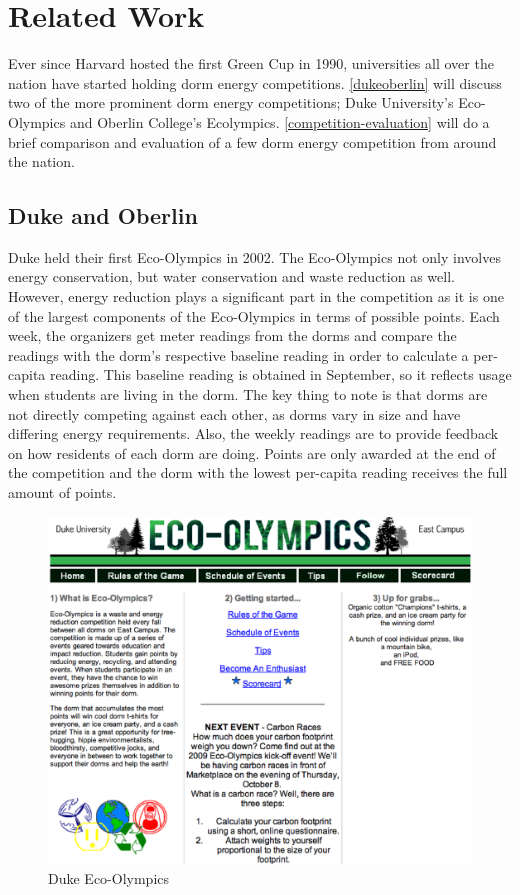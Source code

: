 \chapter{Related Work}
\label{relatedwork}

Ever since Harvard hosted the first Green Cup in 1990\cite{harvard-greencup}, universities all over the nation have started holding dorm energy competitions. \autoref{dukeoberlin} will discuss two of the more prominent dorm energy competitions; Duke University's Eco-Olympics and Oberlin College's Ecolympics.  \autoref{competition-evaluation} will do a brief comparison and evaluation of a few dorm energy competition from around the nation.

\section{Duke and Oberlin}
\label{dukeoberlin}

Duke held their first Eco-Olympics\cite{duke-eco-olympics} in 2002.  The Eco-Olympics not only involves energy conservation, but water conservation and waste reduction as well.  However, energy reduction plays a significant part in the competition as it is one of the largest components of the Eco-Olympics in terms of possible points.  Each week, the organizers get meter readings from the dorms and compare the readings with the dorm's respective baseline reading in order to calculate a per-capita reading.  This baseline reading is obtained in September, so it reflects usage when students are living in the dorm.   The key thing to note is that dorms are not directly competing against each other, as dorms vary in size and have differing energy requirements.  Also, the weekly readings are to provide feedback on how residents of each dorm are doing.  Points are only awarded at the end of the competition and the dorm with the lowest per-capita reading receives the full amount of points.

\begin{figure}
	\centering
	\includegraphics[scale=0.25]{images/duke-ecolympics.eps}
	\caption{Duke Eco-Olympics}
\end{figure}

